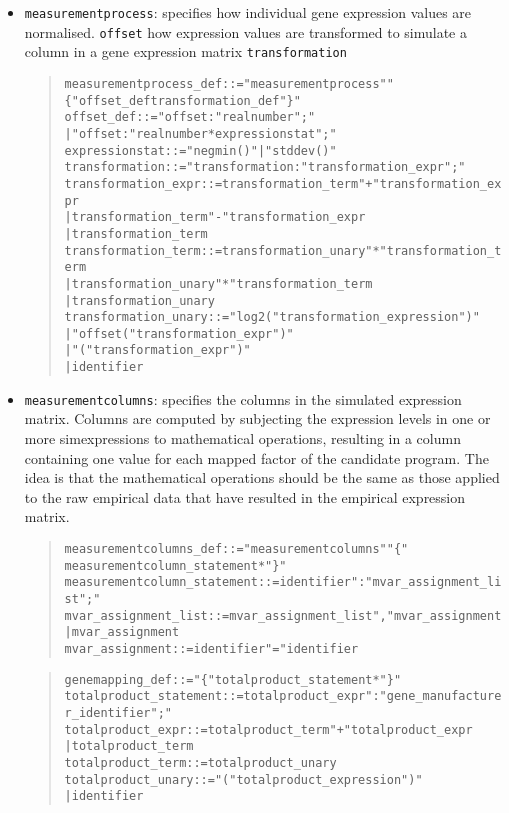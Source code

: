 \documentclass[a4paper,fleqn]{article}
\newcommand{\computercode}[1]{\texttt{#1}}
\newenvironment{ebnfrule}{\begin{footnotesize}\begin{quote}\begin{alltt}}{\end{alltt}\end{quote}\end{footnotesize}}
\begin{document}
\begin{itemize}
\item\computercode {measurementprocess}: specifies how individual gene
  expression values are normalised. \computercode{offset} how
  expression values are transformed to simulate a column in a gene
  expression matrix \computercode{transformation}

\begin{ebnfrule}

measurementprocess_def ::= "measurementprocess" "\{" offset_def transformation_def "\}"
offset_def ::= "offset:" realnumber ";"
        | "offset:" realnumber * expressionstat ";"
expressionstat ::= "negmin()" | "stddev()"
transformation ::= "transformation:" transformation_expr ";"
transformation_expr ::= transformation_term "+" transformation_expr
        | transformation_term "-" transformation_expr
        | transformation_term
transformation_term ::= transformation_unary "*" transformation_term
        | transformation_unary "*" transformation_term
        | transformation_unary
transformation_unary ::= "log2(" transformation_expression ")"
        | "offset(" transformation_expr ")"
        | "(" transformation_expr ")"
        | identifier

\end{ebnfrule}

\item \computercode{measurementcolumns}: specifies the columns in the
  simulated expression matrix. Columns are computed by subjecting the
  expression levels in one or more simexpressions to mathematical
  operations, resulting in a column containing one value for each
  mapped factor of the candidate program. The idea is that the
  mathematical operations should be the same as those applied to the
  raw empirical data that have resulted in the empirical expression
  matrix.

\begin{ebnfrule}
measurementcolumns_def ::=  "measurementcolumns" "\{" 
measurementcolumn_statement* "\}"
measurementcolumn_statement ::= identifier ":" mvar_assignment_list ";"
mvar_assignment_list ::= mvar_assignment_list "," mvar_assignment
        | mvar_assignment
mvar_assignment ::= identifier "=" identifier
\end{ebnfrule}

\begin{ebnfrule}
genemapping_def ::= "\{" totalproduct_statement* "\}" 
totalproduct_statement ::= totalproduct_expr ":" gene_manufacturer_identifier ";"
totalproduct_expr ::= totalproduct_term "+" totalproduct_expr
        | totalproduct_term
totalproduct_term ::= totalproduct_unary
totalproduct_unary ::= "(" totalproduct_expression ")"
        | identifier


\end{ebnfrule}
\end{itemize}
\end{document}
